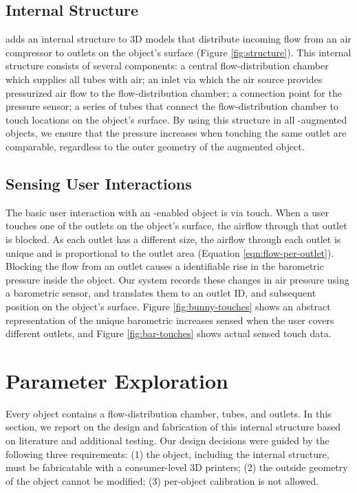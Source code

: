 			\subsection{Internal Structure}
				\at adds an internal structure to 3D models that distribute incoming flow
				from an air compressor to outlets on the object's surface
				(Figure \ref{fig:structure}). This internal structure consists of several
				components: a central flow-distribution chamber which supplies all tubes
				with air; an inlet via which the air source provides pressurized air flow
				to the flow-distribution chamber; a connection point for the pressure
				sensor; a series of tubes that connect the flow-distribution chamber to
				touch locations on the object's surface. By using this structure in all
				\at-augmented objects, we ensure that the pressure increases when touching
				the same outlet are comparable, regardless to the outer geometry of the
				augmented object.

			\subsection{Sensing User Interactions}
				The basic user interaction with an \at-enabled object is via touch. When a
				user touches one of the outlets on the object's surface, the airflow
				through that outlet is blocked. As each outlet has a different size, the
				airflow through each outlet is unique and is proportional to the outlet
				area (Equation \ref{eqn:flow-per-outlet}). Blocking the flow from an outlet causes
				a identifiable rise in the barometric pressure inside the object. Our
				system records these changes in air pressure using a barometric sensor,
				and translates them to an outlet ID, and subsequent position on the
				object's surface. Figure \ref{fig:bunny-touches} shows an abstract
				representation of the unique barometric increases sensed when the user
				covers different outlets, and Figure \ref{fig:bar-touches} shows actual sensed
				touch data.

    \section{Parameter Exploration}
			Every \at object contains a flow-distribution chamber, tubes, and outlets.
			In this section, we report on the design and fabrication of this internal
			structure based on literature and additional testing. Our design decisions
			were guided by the following three requirements: (1) the object, including
			the internal structure, must be fabricatable with a consumer-level 3D
			printers; (2) the outside geometry of the object cannot be modified; (3)
			per-object calibration is not allowed.

